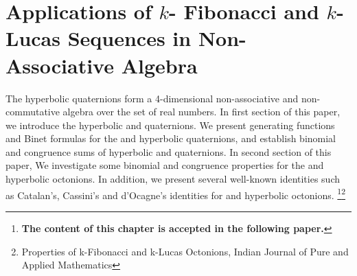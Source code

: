 %
%
\let\textcircled=\pgftextcircled
\chapter{Applications of $k$- Fibonacci and $k$- Lucas Sequences in Non-Associative Algebra}
\label{chap:Applications of $k$- Fibonacci and $k$- Lucas Sequences }
The hyperbolic quaternions form a 4-dimensional non-associative and non-commutative algebra over the set of real numbers. In first section of this paper, we introduce the hyperbolic \kF\hspace{.5mm} and \kL\hspace{.5mm} quaternions. We present generating functions and Binet formulas for the \kF\hspace{.5mm} and \kL\hspace{.5mm} hyperbolic quaternions, and establish binomial and congruence sums of hyperbolic \kF\hspace{.5mm} and \kL\hspace{.5mm} quaternions. In second section of this paper, We investigate  some binomial and congruence properties for the \kF\hspace{0mm} and \kL\hspace{0mm} hyperbolic octonions. In addition, we present several well-known identities such as Catalan's, Cassini's and d'Ocagne's identities for \kF\hspace{0mm} and \kL\hspace{0mm} hyperbolic octonions. 
\vspace{2mm}
\let\thefootnote\relax\footnote{\textbf{\hspace{-0.78cm}The content of this chapter is accepted in the following paper.}}\footnote{\hspace{-0.78cm}Properties of k-Fibonacci and k-Lucas Octonions, Indian Journal of Pure and Applied Mathematics}
